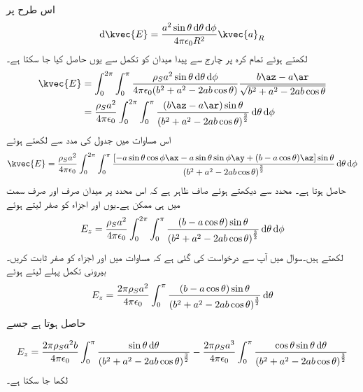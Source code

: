 اس طرح  پر
%
\begin{align*}
\dif \kvec{E}= \frac{a^2 \sin \theta \dif \theta \dif \phi}{4 \pi \epsilon_0 R^2} \kvec{a}_R
\end{align*} 
لکھتے ہوئے تمام کرہ پر چارج سے پیدا میدان کو تکمل سے یوں حاصل کیا جا سکتا ہے۔
\begin{gather}
\begin{aligned}
\kvec{E}&=\int_{0}^{2\pi} \int_0^{\pi} \frac{\rho_S a^2 \sin \theta \dif \theta \dif \phi}{4 \pi \epsilon_0 (b^2+a^2-2 ab \cos \theta)} \frac{b\az-a\ar}{\sqrt{b^2+a^2-2 ab \cos \theta}}\\
&=\frac{\rho_S a^2}{4 \pi \epsilon_0}\int_{0}^{2\pi} \int_0^{\pi} \frac{ (b\az-a\ar)\sin \theta }{ \left(b^2+a^2-2 ab \cos \theta \right)^{\frac{3}{2}}} \dif \theta \dif \phi
\end{aligned}
\end{gather}
اس مساوات میں جدول  کی مدد سے  لکھتے ہوئے
\begin{align}\label{مساوات_کولمب_کرہ-سطحی_چارج_کثافت_کا_میدان}
\kvec{E}=\frac{\rho_S a^2}{4 \pi \epsilon_0}\int_{0}^{2\pi} \int_0^{\pi} \frac{[-a \sin \theta \cos \phi \ax-a \sin \theta \sin \phi \ay+ (b-a \cos \theta)\az ]\sin \theta }{ \left(b^2+a^2-2 ab \cos \theta \right)^{\frac{3}{2}}} \dif \theta \dif \phi
\end{align}
حاصل ہوتا ہے۔ محدد سے دیکھتے ہوئے صاف ظاہر ہے کہ اس محدد پر میدان صرف اور صرف  سمت میں ہی ممکن ہے۔یوں  اور  اجزاء کو صفر لیتے ہوئے
\begin{align}
E_z=\frac{\rho_S a^2}{4 \pi \epsilon_0}\int_{0}^{2\pi} \int_0^{\pi} \frac{(b-a \cos \theta) \sin \theta }{ \left(b^2+a^2-2 ab \cos \theta \right)^{\frac{3}{2}}} \dif \theta \dif \phi
\end{align}
لکھتے ہیں۔سوال  میں آپ سے  درخواست کی گئی ہے کہ  مساوات  میں  اور  اجزاء کو صفر ثابت کریں۔بیرونی تکمل پہلے لیتے ہوئے
\begin{align}
E_z=\frac{2 \pi\rho_S a^2}{4 \pi \epsilon_0} \int_0^{\pi} \frac{(b-a \cos \theta) \sin \theta }{ \left(b^2+a^2-2 ab \cos \theta \right)^{\frac{3}{2}}} \dif \theta
\end{align}
حاصل ہوتا ہے جسے

\begin{align}\label{مساوات_کولمب_کرہ_چارج_کا_میدان_الف}
E_z=\frac{2 \pi\rho_S a^2 b}{4 \pi \epsilon_0} \int_0^{\pi} \frac{ \sin \theta \dif \theta}{ \left(b^2+a^2-2 ab \cos \theta \right)^{\frac{3}{2}}}-\frac{2 \pi\rho_S a^3}{4 \pi \epsilon_0} \int_0^{\pi} \frac{\cos \theta \sin \theta \dif \theta}{ \left(b^2+a^2-2 ab \cos \theta \right)^{\frac{3}{2}}}
\end{align}
لکھا جا سکتا ہے۔

